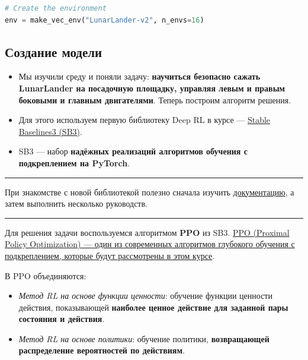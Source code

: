 \documentclass[11pt,a4paper]{article}
\begin{document}
\begin{lstlisting}[language=Python]
# Create the environment
env = make_vec_env("LunarLander-v2", n_envs=16)
\end{lstlisting}

\subsection{Создание модели}\label{create-the-model}

\begin{itemize}
\item
  Мы изучили среду и поняли задачу: \textbf{научиться безопасно сажать LunarLander на посадочную площадку, управляя левым и правым боковыми и главным двигателями}. Теперь построим алгоритм решения.
\item
  Для этого используем первую библиотеку Deep RL в курсе --- \href{https://stable-baselines3.readthedocs.io/en/master/}{Stable Baselines3 (SB3)}.
\item
  SB3 --- набор \textbf{надёжных реализаций алгоритмов обучения с подкреплением на PyTorch}.
\end{itemize}

\begin{center}\rule{0.5\linewidth}{0.5pt}\end{center}

При знакомстве с новой библиотекой полезно сначала изучить \href{https://stable-baselines3.readthedocs.io/en/master/}{документацию}, а затем выполнить несколько руководств.

\begin{center}\rule{0.5\linewidth}{0.5pt}\end{center}


Для решения задачи воспользуемся алгоритмом \textbf{PPO} из SB3. \href{https://stable-baselines3.readthedocs.io/en/master/modules/ppo.html\#example\%5D}{PPO (Proximal Policy Optimization) --- один из современных алгоритмов глубокого обучения с подкреплением, которые будут рассмотрены в этом курсе}.

В PPO объединяются:

\begin{itemize}
\tightlist
\item
  \emph{Метод RL на основе функции ценности}: обучение функции ценности действия, показывающей \textbf{наиболее ценное действие для заданной пары состояния и действия}.
\item
  \emph{Метод RL на основе политики}: обучение политики, \textbf{возвращающей распределение вероятностей по действиям}.
\end{itemize}
\end{document}
